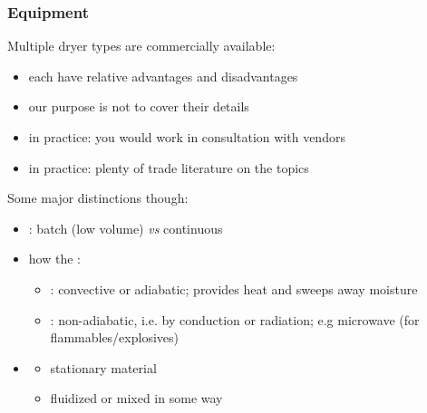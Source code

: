 \begin{frame}\frametitle{Equipment}
	Multiple dryer types are commercially available:
	\begin{itemize}
		\item	each have relative advantages and disadvantages
		\item	our purpose is not to cover their details
		\item	in practice: you would work in consultation with vendors
		\item	in practice: plenty of trade literature on the topics {}
	\end{itemize}
	\vspace{12pt}
	Some major distinctions though:
	\begin{itemize}
		\item	\textbf{{\color{myGreen}{mode of operation}}}: batch (low volume) \emph{vs} continuous
		\item	how the \textbf{{\color{myGreen}{heat is provided}}}:
		\begin{itemize}
			\item	{\color{purple}{direct heat}}: convective or adiabatic; provides heat and sweeps away moisture
			\item	{\color{purple}{indirect heat}}: non-adiabatic, i.e. by conduction or radiation; e.g microwave (for flammables/explosives)
		\end{itemize}
		\item	\textbf{{\color{myGreen}{degree of agitation}}}
		\begin{itemize}
			\item	stationary material
			\item	fluidized or mixed in some way
		\end{itemize}
	\end{itemize}
\end{frame}

